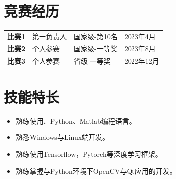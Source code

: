 
\section{\makebox[\widthof{\faTrophy}][c]{\color{SCU_Red}{\faTrophy}}\quad 竞赛经历}
\vspace{-1em}
\begin{table}[h!]
    \begin{tabularx}{\textwidth}{Xp{}p{}p{}}
        \textbf{比赛1} & 第一负责人 & 国家级-第10名 & 2023年4月 \\
        \textbf{比赛2} & 个人参赛 & 国家级-一等奖 & 2023年8月 \\
        \textbf{比赛3} & 个人参赛 & 省级-一等奖 & 2022年12月 \\
    \end{tabularx}
\end{table}

\section{\makebox[\widthof{\faWrench}][c]{\color{SCU_Red}{\faWrench}}\quad 技能特长}
\vspace{0.5em}
\begin{itemize}
    \item 熟练使用\Cpp 、Python、Matlab编程语言。
    \item 熟悉Windows与Linux端开发。
    \item 熟练使用Tensorflow，Pytorch等深度学习框架。
    \item 熟练掌握\Cpp 与Python环境下OpenCV与Qt应用的开发。
\end{itemize}


